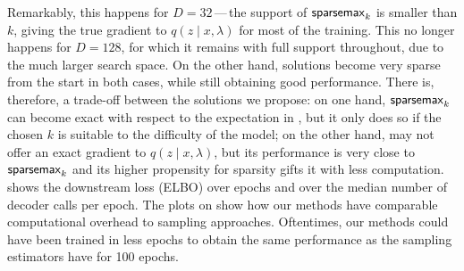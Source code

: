 Remarkably, this happens for $D\!=\!32$\,---\,the support of
$\operatorname{\mathsf{sparsemax}_\text{$k$}}$ is smaller than $k$, giving the true gradient to
$q(z\mid x, \lambda)$ for most of the training. This no longer
happens for $D\!=\!128$, for which it remains with full support
throughout, due to the much larger search space. On the other hand,
\smap solutions become very sparse from the start in both cases,
while still obtaining good performance. There is, therefore, a
trade-off between the solutions we propose: on one hand,
$\operatorname{\mathsf{sparsemax}_\text{$k$}}$ can become exact with respect to the expectation in
, but it only does so if the chosen $k$ is suitable to
the difficulty of the model; on the other hand, \smap may not offer
an exact gradient to $q(z\mid x, \lambda)$, but its performance is
very close to $\operatorname{\mathsf{sparsemax}_\text{$k$}}$ and its higher propensity for sparsity
gifts it with less computation.  shows the
downstream loss (ELBO) over epochs and over the median number of
decoder calls per epoch. The plots on 
show how our methods have comparable computational overhead to
sampling approaches. Oftentimes, our methods could have been trained
in less epochs to obtain the same performance as the sampling
estimators have for 100 epochs.

